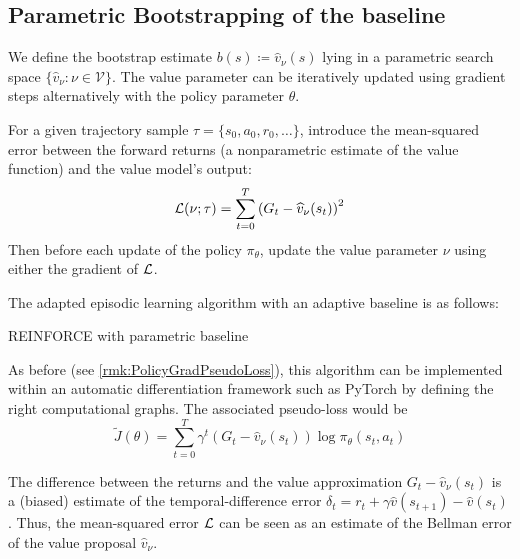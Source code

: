 \documentclass[../course-notes.tex]{subfiles}
\begin{document}
\subsection{Parametric Bootstrapping of the baseline}\label{sec:REINFORCEparametricBaseline}

We define the bootstrap estimate $b(s) \coloneqq \widehat{v}_\nu(s)$ lying in a parametric search space $\{\widehat{v}_\nu : \nu \in \mathcal{V}\}$. The value parameter can be iteratively updated using gradient steps alternatively with the policy parameter $\theta$.

For a given trajectory sample $\tau=\{s_0,a_0,r_0,\ldots\}$, introduce the mean-squared error between the forward returns (a nonparametric estimate of the value function) and the value model's output:
\begin{equation}
	\mathcal{L}(\nu; \tau) =
	\sum_{t=0}^{T} \left(G_t-\widehat{v}_\nu(s_t)\right)^2
\end{equation}
Then before each update of the policy $\pi_\theta$, update the value parameter $\nu$ using either the gradient of $\mathcal{L}$.

The adapted episodic learning algorithm with an adaptive baseline is as follows:
\begin{algorithm}
	\caption{REINFORCE with parametric baseline}\label{algo:REINFORCEparamBaseline}
\end{algorithm}

As before (see \cref{rmk:PolicyGradPseudoLoss}), this algorithm can be implemented within an automatic differentiation framework such as \textsf{PyTorch} by defining the right computational graphs. The associated pseudo-loss would be
\[
\tilde{J}(\theta) = 
\sum_{t=0}^T \gamma^t (G_t - \widehat{v}_\nu(s_t)) \log\pi_\theta(s_t, a_t)
\]

\begin{remark}
	The difference between the returns and the value approximation $G_t - \widehat{v}_\nu(s_t)$ is a (biased) estimate of the temporal-difference error $\delta_t = r_t + \gamma \widehat{v}(s_{t+1}) - \widehat{v}(s_t)$. Thus, the mean-squared error $\mathcal{L}$ can be seen as an estimate of the Bellman error of the value proposal $\widehat{v}_\nu$.
\end{remark}
\end{document}
